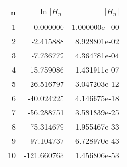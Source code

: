 \begin{tabular}{rrr}
\toprule
 n &     $\ln{|H_n|}$ &           $|H_n|$ \\
\midrule
1 &    0.000000 &  1.000000e+00 \\
2 &   -2.415888 &  8.928801e-02 \\
3 &   -7.736772 &  4.364781e-04 \\
4 &  -15.759086 &  1.431911e-07 \\
5 &  -26.516797 &  3.047203e-12 \\
6 &  -40.024225 &  4.146675e-18 \\
7 &  -56.288751 &  3.581839e-25 \\
8 &  -75.314679 &  1.955467e-33 \\
9 &  -97.104737 &  6.728970e-43 \\
10 & -121.660763 &  1.456806e-53 \\
\bottomrule
\end{tabular}
